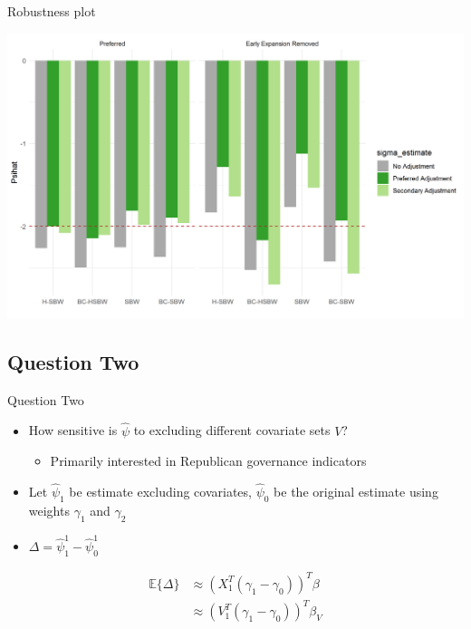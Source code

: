 \documentclass[hyperref={pdfpagelabels=false}]{beamer}
\begin{document}
\begin{frame}{Robustness plot}

\begin{center}
	\includegraphics[scale=0.5]{01_Plots/all-estimates-c1c2.png}
\end{center}
\end{frame}

\subsection{Question Two}

\begin{frame}{Question Two}
    \begin{itemize}
        \item How sensitive is $\hat{\psi}$ to excluding different covariate sets $V$? \bigskip 
        \begin{itemize}
            \item Primarily interested in Republican governance indicators \bigskip
        \end{itemize}
        \item Let $\hat{\psi}_1$ be estimate excluding covariates, $\hat{\psi}_0$ be the original estimate using weights $\gamma_1$ and $\gamma_2$ \bigskip
        \item $\Delta = \hat{\psi}^1_1 - \hat{\psi}^1_0$ \bigskip
    \end{itemize}
\begin{align*}
\mathbb{E}\{\Delta\} &\approx (X_1^T(\gamma_1 - \gamma_0))^T\beta \\ &\approx (V_1^T(\gamma_1 - \gamma_0))^T\beta_V
\end{align*}

\end{frame}
\end{document}
